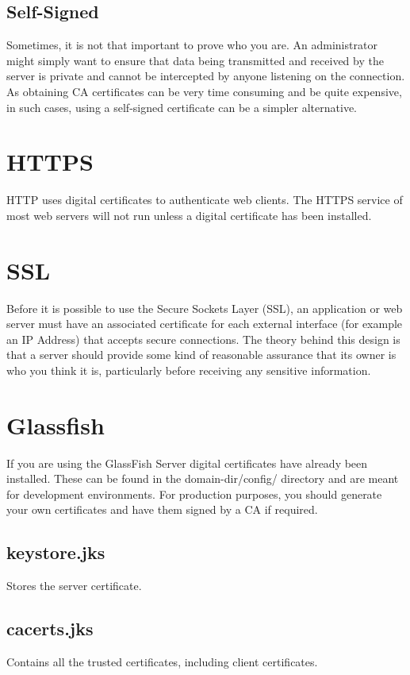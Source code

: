 \documentclass[12pt,a4paper]{report}
\begin{document}
\subsection{Self-Signed}
Sometimes, it is not that important to prove who you are.
An administrator might simply want to ensure that data being transmitted and received by the server is private and cannot be intercepted by anyone listening on the connection. As obtaining CA certificates can be very time consuming and be quite expensive, in such cases, using a self-signed certificate can be a simpler alternative.

\section{HTTPS}
HTTP uses digital certificates to authenticate web clients. The HTTPS service of most web servers will not run unless a digital certificate has been installed.

\section{SSL}
Before it is possible to use the Secure Sockets Layer (SSL), an application or web server must have an associated certificate for each external interface (for example an IP Address) that accepts secure connections. The theory behind this design is that a server should provide some kind of reasonable assurance that its owner is who you think it is, particularly before receiving any sensitive information.

\section{Glassfish}
If you are using the GlassFish Server digital certificates have already been installed. These can be found in the domain-dir/config/ directory and are meant for development environments. For production purposes, you should generate your own certificates and have them signed by a CA if required.

\subsection{keystore.jks}
Stores the server certificate.

\subsection{cacerts.jks}
Contains all the trusted certificates, including client certificates.
\end{document}
